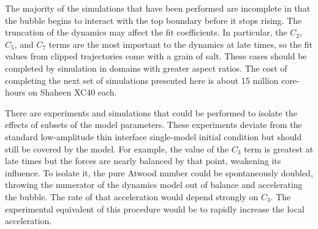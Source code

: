 The majority of the simulations that have been performed are incomplete in that the bubble begins to interact with the top boundary before it stops rising.
The truncation of the dynamics may affect the fit coefficients.
In particular, the $C_2$, $C_5$, and $C_7$ terms are the most important to the dynamics at late times, so the fit values from clipped trajectories come with a grain of salt.
These cases should be completed by simulation in domains with greater aspect ratios.
The cost of completing the next set of simulations presented here is about 15 million core-hours on Shaheen XC40 each.

There are experiments and simulations that could be performed to isolate the effects of subsets of the model parameters.
These experiments deviate from the standard low-amplitude thin interface single-model initial condition but should still be covered by the model.
For example, the value of the $C_3$ term is greatest at late times but the forces are nearly balanced by that point, weakening its influence.
To isolate it, the pure Atwood number could be spontaneously doubled, throwing the numerator of the dynamics model out of balance and accelerating the bubble.
The rate of that acceleration would depend strongly on $C_3$.
The experimental equivalent of this procedure would be to rapidly increase the local acceleration.
